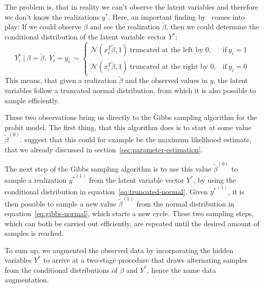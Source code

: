 The problem is, that in reality we can't observe the latent variables and
therefore we don't know the realizations $y^\ast$.
Here, an important finding by~\cite{gibbs-probit-albert-chib} comes
into play: If we could observe $\beta$ and see the realization
$\tilde\beta$, then we could determine the conditional distribution
of the latent variable vector $Y^\ast$:
\begin{equation}
    \label{eq:truncated-normal}
    Y_i^\ast\ |\ \beta = \tilde\beta,\ Y_i=y_i\ \sim
    \begin{cases}
        \mathcal{N}(x_i^T\tilde\beta, 1)\ \text{truncated at the left by 0},  & \text{if}\ y_i = 1 \\
        \mathcal{N}(x_i^T\tilde\beta, 1)\ \text{truncated at the right by 0}, & \text{if}\ y_i = 0
    \end{cases}
\end{equation}
This means, that given a realization $\tilde\beta$ and the observed
values in $y$, the latent variables
follow a truncated normal distribution, from which it is also
possible to sample efficiently.

These two observations bring us directly to the Gibbs sampling algorithm
for the probit model. The first thing, that this algorithm does is
to start at some value $\tilde\beta^{(0)}$.
\cite{gibbs-probit-albert-chib} suggest that this could for example
be the maximum likelihood estimate, that we already discussed in
section~\ref{sec:parameter-estimation}.

The next step of the Gibbs sampling algorithm is to use this value
$\tilde\beta^{(0)}$ to sample a realization ${y^\ast}^{(1)}$ from the latent
variable vector $Y^\ast$, by using the conditional distribution
in equation~\ref{eq:truncated-normal}. Given ${y^\ast}^{(1)}$,
it is then possible to sample a new value $\tilde\beta^{(1)}$ from
the normal distribution in equation~\ref{eq:gibbs-normal},
which starts a new cycle. These two sampling steps, which can
both be carried out efficiently, are repeated until
the desired amount of samples is reached.

To sum up, we augmented the observed data by incorporating the
hidden variables $Y^\ast$ to arrive at a two-stage procedure
that draws alternating samples from the conditional distributions
of $\beta$ and $Y^\ast$, hence the name data augmentation.

\newpage